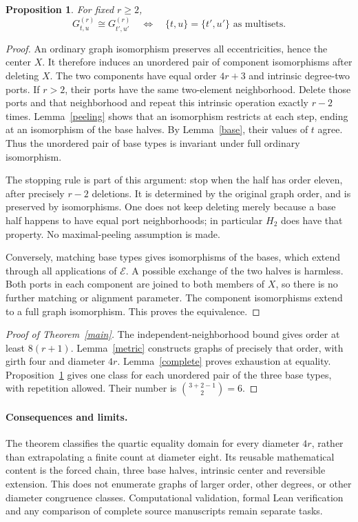 \documentclass[11pt]{article}
\newtheorem{proposition}[theorem]{Proposition}
\theoremstyle{definition}\newtheorem{definition}[theorem]{Definition}
\newcommand{\E}{\mathcal E}
\begin{document}
\begin{proposition}\label{ordinary}
For fixed $r\geq2$,
\[
 G_{t,u}^{(r)}\cong G_{t',u'}^{(r)}
 \quad\Longleftrightarrow\quad
 \{t,u\}=\{t',u'\}\text{ as multisets}.
\]
\end{proposition}
\begin{proof}
An ordinary graph isomorphism preserves all eccentricities, hence
the center $X$. It therefore induces an unordered pair of component
isomorphisms after deleting $X$. The two components have equal
order $4r+3$ and intrinsic degree-two ports. If $r>2$, their ports
have the same two-element neighborhood. Delete those ports and
that neighborhood and repeat this intrinsic operation exactly
$r-2$ times. Lemma~\ref{peeling} shows that an isomorphism restricts
at each step, ending at an isomorphism of the base halves. By
Lemma~\ref{base}, their values of $t$ agree. Thus the unordered
pair of base types is invariant under full ordinary isomorphism.

The stopping rule is part of this argument: stop when the half has
order eleven, after precisely $r-2$ deletions. It is determined by
the original graph order, and is preserved by isomorphisms. One
does not keep deleting merely because a base half happens to have
equal port neighborhoods; in particular $H_2$ does have that
property. No maximal-peeling assumption is made.

Conversely, matching base types gives isomorphisms of the bases,
which extend through all applications of $\E$. A possible exchange
of the two halves is harmless. Both ports in each component are
joined to both members of $X$, so there is no further matching or
alignment parameter. The component isomorphisms extend to a full
graph isomorphism. This proves the equivalence.
\end{proof}

\begin{proof}[Proof of Theorem~\ref{main}]
The independent-neighborhood bound gives order at least $8(r+1)$.
Lemma~\ref{metric} constructs graphs of precisely that order, with
girth four and diameter $4r$. Lemma~\ref{complete} proves exhaustion
at equality. Proposition~\ref{ordinary} gives one class for each
unordered pair of the three base types, with repetition allowed.
Their number is $\binom{3+2-1}{2}=6$.
\end{proof}

\paragraph{Consequences and limits.}
The theorem classifies the quartic equality domain for every
diameter $4r$, rather than extrapolating a finite count at diameter
eight. Its reusable mathematical content is the forced chain,
three base halves, intrinsic center and reversible extension.
This does not enumerate graphs of larger order, other degrees,
or other diameter congruence classes. Computational validation,
formal Lean verification and any comparison of complete source
manuscripts remain separate tasks.
\end{document}
